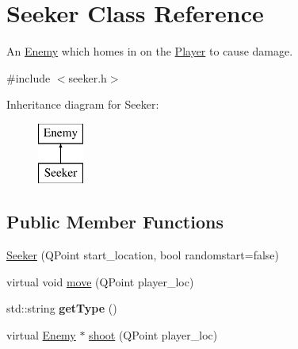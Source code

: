 \hypertarget{classSeeker}{
\section{Seeker Class Reference}
\label{classSeeker}
}


An \hyperlink{classEnemy}{Enemy} which homes in on the \hyperlink{classPlayer}{Player} to cause damage.  




{\ttfamily \#include $<$seeker.h$>$}

Inheritance diagram for Seeker:\begin{figure}[H]
\begin{center}
\leavevmode
\includegraphics[height=2.000000cm]{classSeeker}
\end{center}
\end{figure}
\subsection*{Public Member Functions}
\begin{DoxyCompactItemize}
\item 
\hyperlink{classSeeker_a3b6766e42ed0e15a675268e2efd2d4c3}{Seeker} (QPoint start\_\-location, bool randomstart=false)
\item 
virtual void \hyperlink{classSeeker_ad19597b659baf85c43a10ac82b767b4f}{move} (QPoint player\_\-loc)
\item 
\hypertarget{classSeeker_aa01cd106cf0f671f8e33c054f7bfa394}{
std::string {\bfseries getType} ()}
\label{classSeeker_aa01cd106cf0f671f8e33c054f7bfa394}

\item 
virtual \hyperlink{classEnemy}{Enemy} $\ast$ \hyperlink{classSeeker_aadb68e05817a4f6c94b87c7a753b0fa8}{shoot} (QPoint player\_\-loc)
\end{DoxyCompactItemize}

